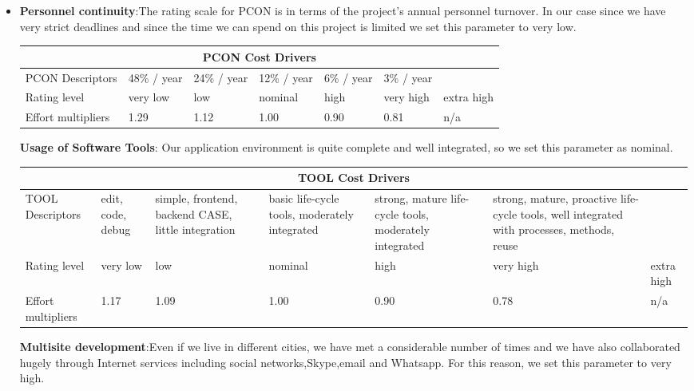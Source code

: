 \begin{itemize}
\item \textbf{Personnel continuity}:The rating scale for PCON is in terms of the project's annual personnel turnover. In our case since we have very strict deadlines and since the time we can
spend on this project is limited we set this parameter to very low.

\begin{longtable}{| m{}| m{} | m{} | m{} | m{} | m{} | m{}| }
\hline
\multicolumn{7}{c}{PCON Cost Drivers}\\
\hline
\hline
PCON Descriptors & 48\% / year & 24\% / year & 12\% / year & 6\% / year & 3\% / year & \\
\hline
Rating level & very low & low & nominal & high & very high & extra high \\
\hline
Effort multipliers & 1.29 & 1.12 & 1.00 & 0.90 & 0.81 & n/a \\
\hline
\end{longtable}

\textbf{Usage of Software Tools}: Our application environment is quite complete and well integrated, so
we set this parameter as nominal.

\begin{longtable}{| m{}| m{} | m{} | m{} | m{} | m{} | m{}| }
\hline
\multicolumn{7}{c}{TOOL Cost Drivers}\\
\hline
\hline
TOOL Descriptors & edit, code, debug & simple, frontend, backend CASE, little integration & basic life-cycle tools, moderately integrated & strong, mature life-cycle tools, moderately integrated & strong, mature, proactive life-cycle tools, well integrated with processes, methods, reuse
& \\
\hline
Rating level & very low & low & nominal & high & very high & extra high \\
\hline
Effort multipliers & 1.17 & 1.09 & 1.00 & 0.90 & 0.78 & n/a \\
\hline
\end{longtable}

\textbf{Multisite development}:Even if we live in different cities, we have met a considerable number of times and we have also collaborated hugely through Internet services including social networks,Skype,email
and Whatsapp. For this reason, we  set this parameter to very high.


\end{itemize}
